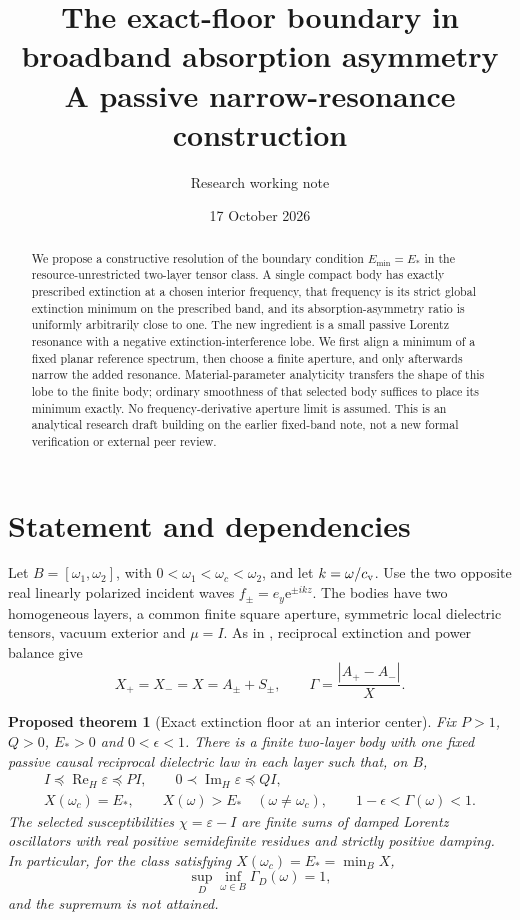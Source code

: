 \documentclass[11pt]{article}
\title{The exact-floor boundary in broadband absorption asymmetry\\
\large A passive narrow-resonance construction}
\author{Research working note}
\date{17 October 2026}
\newtheorem{theorem}{Proposed theorem}
\newcommand{\ReH}{\operatorname{Re}_{H}}
\newcommand{\ImH}{\operatorname{Im}_{H}}
\newcommand{\abs}[1]{\left|#1\right|}
\newcommand{\ee}{\mathrm e}
\begin{document}
\maketitle
\begin{abstract}
We propose a constructive resolution of the boundary condition
$E_{\min}=E_*$ in the resource-unrestricted two-layer tensor class.
A single compact body has exactly prescribed extinction at a chosen interior
frequency, that frequency is its strict global extinction minimum on the
prescribed band, and its absorption-asymmetry ratio is uniformly arbitrarily
close to one. The new ingredient is a small passive Lorentz resonance with a
negative extinction-interference lobe. We first align a minimum of a fixed
planar reference spectrum, then choose a finite aperture, and only afterwards
narrow the added resonance. Material-parameter analyticity transfers the
shape of this lobe to the finite body; ordinary smoothness of that selected
body suffices to place its minimum exactly. No frequency-derivative aperture
limit is assumed. This is an analytical research draft building on the earlier
fixed-band note, not a new formal verification or external peer review.
\end{abstract}

\section{Statement and dependencies}
Let $B=[\omega_1,\omega_2]$, with
$0<\omega_1<\omega_c<\omega_2$, and let $k=\omega/c_{\rm v}$.
Use the two opposite real linearly polarized incident waves
$f_\pm=e_y\ee^{\pm ikz}$.
The bodies have two homogeneous layers, a common finite square aperture,
symmetric local dielectric tensors, vacuum exterior and $\mu=I$.
As in \cite{base,strict}, reciprocal extinction and power balance give
\[
 X_+=X_-=X=A_\pm+S_\pm,\qquad
 \Gamma=\frac{\abs{A_+-A_-}}{X}.
\]

\begin{theorem}[Exact extinction floor at an interior center]\label{thm:main}
Fix $P>1$, $Q>0$, $E_*>0$ and $0<\epsilon<1$.
There is a finite two-layer body with one fixed passive causal reciprocal
dielectric law in each layer such that, on $B$,
\begin{gather}
 I\preceq\ReH\varepsilon\preceq PI,\qquad
 0\prec\ImH\varepsilon\preceq QI,\label{eq:caps}\\
 X(\omega_c)=E_*,\qquad
 X(\omega)>E_*\quad(\omega\ne\omega_c),\qquad
 1-\epsilon<\Gamma(\omega)<1.\label{eq:target}
\end{gather}
The selected susceptibilities $\chi=\varepsilon-I$ are finite sums of damped
Lorentz oscillators with real
positive semidefinite residues and strictly positive damping.
In particular, for the class satisfying $X(\omega_c)=E_*=\min_B X$,
\[
 \sup_D\inf_{\omega\in B}\Gamma_D(\omega)=1,
\]
and the supremum is not attained.
\end{theorem}
\end{document}
